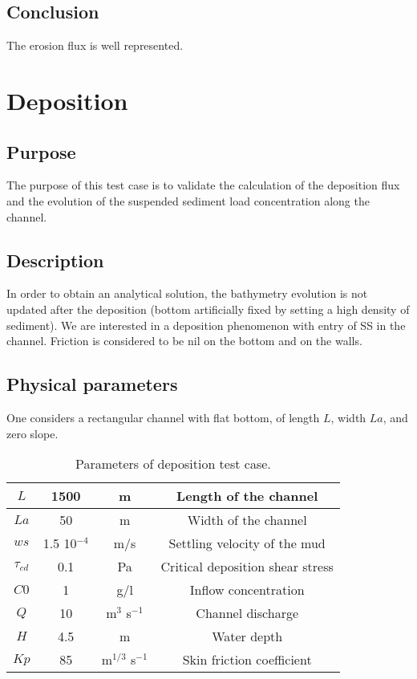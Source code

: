 \subsection{Conclusion}

The erosion flux is well represented.

\section{Deposition}

\subsection{Purpose}

The purpose of this test case is to validate the calculation of the
deposition flux and the evolution of the suspended sediment load
concentration along the channel.

\subsection{Description}

In order to obtain an analytical solution, the bathymetry evolution
is not updated after the deposition (bottom artificially fixed by
setting a high density of sediment).
We are interested in a deposition phenomenon with entry of SS in the
channel. Friction is considered to be nil on the bottom and
on the walls.

\subsection{Physical parameters}

One considers a rectangular channel with flat bottom, of length $L$,
width $La$, and zero slope.

\begin{table}[h!] %
\begin{center}
\begin{tabular}{|c|c|c|c|} \hline
$L$&1500&m&Length of the channel \\ \hline
$La$&50&m&Width of the channel \\ \hline
$ws$&1.5 10$^{-4}$&m/s&Settling velocity of the mud \\ \hline
$\tau_{cd}$&0.1&Pa&Critical deposition shear stress \\ \hline
$C0$&1&g/l&Inflow concentration \\ \hline
$Q$&10&m$^{3}$ s$^{-1}$&Channel discharge \\ \hline
$H$&4.5&m&Water depth \\ \hline
$Kp$&85&m$^{1/3}$ s$^{-1}$&Skin friction coefficient \\ \hline
\end{tabular}
\caption{ Parameters of deposition test case. }
\end{center}
\label{}
\end{table}

